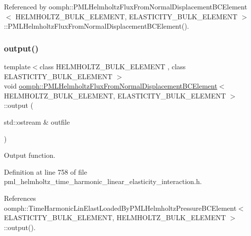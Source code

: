 Referenced by oomph\+::\+P\+M\+L\+Helmholtz\+Flux\+From\+Normal\+Displacement\+B\+C\+Element$<$ H\+E\+L\+M\+H\+O\+L\+T\+Z\+\_\+\+B\+U\+L\+K\+\_\+\+E\+L\+E\+M\+E\+N\+T, E\+L\+A\+S\+T\+I\+C\+I\+T\+Y\+\_\+\+B\+U\+L\+K\+\_\+\+E\+L\+E\+M\+E\+N\+T $>$\+::\+P\+M\+L\+Helmholtz\+Flux\+From\+Normal\+Displacement\+B\+C\+Element().

\mbox{\label{classoomph_1_1PMLHelmholtzFluxFromNormalDisplacementBCElement_a64c0556634eed3070ae9a63d2a43efb5}} 
\subsubsection{\texorpdfstring{output()}{output()}\hspace{0.1cm}{\footnotesize\ttfamily [1/4]}}
{\footnotesize\ttfamily template$<$class H\+E\+L\+M\+H\+O\+L\+T\+Z\+\_\+\+B\+U\+L\+K\+\_\+\+E\+L\+E\+M\+E\+NT , class E\+L\+A\+S\+T\+I\+C\+I\+T\+Y\+\_\+\+B\+U\+L\+K\+\_\+\+E\+L\+E\+M\+E\+NT $>$ \\
void \hyperlink{classoomph_1_1PMLHelmholtzFluxFromNormalDisplacementBCElement}{oomph\+::\+P\+M\+L\+Helmholtz\+Flux\+From\+Normal\+Displacement\+B\+C\+Element}$<$ H\+E\+L\+M\+H\+O\+L\+T\+Z\+\_\+\+B\+U\+L\+K\+\_\+\+E\+L\+E\+M\+E\+NT, E\+L\+A\+S\+T\+I\+C\+I\+T\+Y\+\_\+\+B\+U\+L\+K\+\_\+\+E\+L\+E\+M\+E\+NT $>$\+::output (\begin{DoxyParamCaption}\item[{std\+::ostream \&}]{outfile }\end{DoxyParamCaption})\hspace{0.3cm}{\ttfamily [inline]}}



Output function. 



Definition at line 758 of file pml\+\_\+helmholtz\+\_\+time\+\_\+harmonic\+\_\+linear\+\_\+elasticity\+\_\+interaction.\+h.



References oomph\+::\+Time\+Harmonic\+Lin\+Elast\+Loaded\+By\+P\+M\+L\+Helmholtz\+Pressure\+B\+C\+Element$<$ E\+L\+A\+S\+T\+I\+C\+I\+T\+Y\+\_\+\+B\+U\+L\+K\+\_\+\+E\+L\+E\+M\+E\+N\+T, H\+E\+L\+M\+H\+O\+L\+T\+Z\+\_\+\+B\+U\+L\+K\+\_\+\+E\+L\+E\+M\+E\+N\+T $>$\+::output().

